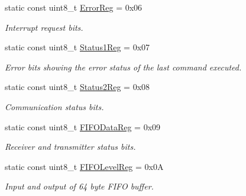 \begin{DoxyCompactItemize}
\mbox{\label{classMFRC522_abd929db950e038f6b964d0620dc4a606}} 
static const uint8\+\_\+t \hyperlink{classMFRC522_abd929db950e038f6b964d0620dc4a606}{Error\+Reg} = 0x06
\begin{DoxyCompactList}\small\item\em Interrupt request bits. \end{DoxyCompactList}\item 
\mbox{\label{classMFRC522_aa08149e9d55faba97505fff8f089df6a}} 
static const uint8\+\_\+t \hyperlink{classMFRC522_aa08149e9d55faba97505fff8f089df6a}{Status1\+Reg} = 0x07
\begin{DoxyCompactList}\small\item\em Error bits showing the error status of the last command executed. \end{DoxyCompactList}\item 
\mbox{\label{classMFRC522_a559ef7dfe0c245735642111734067580}} 
static const uint8\+\_\+t \hyperlink{classMFRC522_a559ef7dfe0c245735642111734067580}{Status2\+Reg} = 0x08
\begin{DoxyCompactList}\small\item\em Communication status bits. \end{DoxyCompactList}\item 
\mbox{\label{classMFRC522_a83b5946c82d3ea0efbeb433fc7883819}} 
static const uint8\+\_\+t \hyperlink{classMFRC522_a83b5946c82d3ea0efbeb433fc7883819}{F\+I\+F\+O\+Data\+Reg} = 0x09
\begin{DoxyCompactList}\small\item\em Receiver and transmitter status bits. \end{DoxyCompactList}\item 
\mbox{\label{classMFRC522_add57d42bb2de0e5d860b103f62c08a9d}} 
static const uint8\+\_\+t \hyperlink{classMFRC522_add57d42bb2de0e5d860b103f62c08a9d}{F\+I\+F\+O\+Level\+Reg} = 0x0A
\begin{DoxyCompactList}\small\item\em Input and output of 64 byte F\+I\+FO buffer. \end{DoxyCompactList}\item 
\mbox{\label{classMFRC522_ad7b977a0fecf852e1a564a0339b470b4}} 

\end{DoxyCompactItemize}
